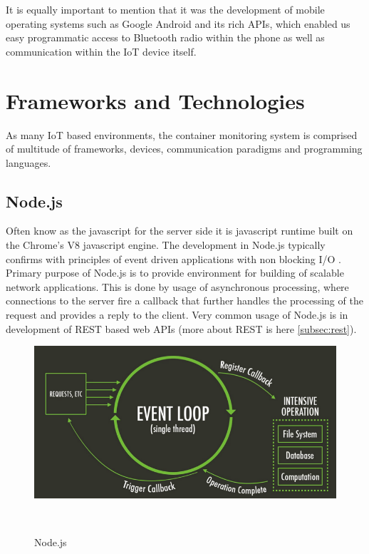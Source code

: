 \bigskip

It is equally important to mention that it was the development of mobile operating systems such as Google Android \citep{android} and its rich APIs, which enabled us easy programmatic access to Bluetooth radio within the phone as well as communication within the IoT device itself.


\section{Frameworks and Technologies}
\label{sec:fram-techn}

As many IoT based environments, the container monitoring system is comprised of multitude of frameworks, devices, communication paradigms and programming languages.

\subsection{Node.js}
\label{subsec:Node}

Often know as the javascript for the server side it is javascript runtime built on the Chrome's V8 javascript engine. The development in Node.js typically confirms with principles of event driven applications with non blocking I/O \citep{nodejs}. Primary purpose of Node.js is to provide environment for building of scalable network applications. This is done by usage of asynchronous processing, where connections to the server fire a callback that further handles the processing of the request and provides a reply to the client. Very common usage of Node.js is in development of REST based web APIs (more about REST is here \autoref{subsec:rest}).

\bigskip
\begin{figure}[H]
\centering
\includegraphics[scale=0.3]{gfx/node} 
\caption{Node.js}~\label{fig:node}
\end{figure}

